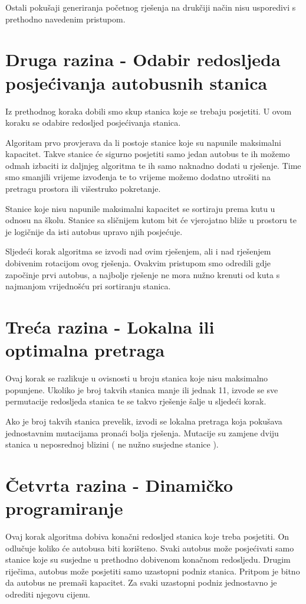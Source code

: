 \documentclass[times, utf8, seminar, numeric]{fer}
\begin{document}
Ostali pokušaji generiranja početnog rješenja na drukčiji način nisu usporedivi s prethodno navedenim pristupom.

\section{Druga razina - Odabir redosljeda posjećivanja autobusnih stanica}
Iz prethodnog koraka dobili smo skup stanica koje se trebaju posjetiti. U ovom koraku se odabire redosljed posjećivanja stanica.

Algoritam prvo provjerava da li postoje stanice koje su napunile maksimalni kapacitet. Takve stanice će sigurno posjetiti samo jedan autobus te ih možemo odmah izbaciti iz daljnjeg algoritma te ih samo naknadno dodati u rješenje. Time smo smanjili vrijeme izvođenja te to vrijeme možemo dodatno utrošiti na pretragu prostora ili višestruko pokretanje.

Stanice koje nisu napunile maksimalni kapacitet se sortiraju prema kutu u odnosu na školu. Stanice sa sličnijem kutom bit će vjerojatno bliže u prostoru te je logičnije da isti autobus upravo njih posjećuje.

Sljedeći korak algoritma se izvodi nad ovim rješenjem, ali i nad rješenjem dobivenim rotacijom ovog rješenja. Ovakvim pristupom smo odredili gdje započinje prvi autobus, a najbolje rješenje ne mora nužno krenuti od kuta s najmanjom vrijednošću pri sortiranju stanica.

\section{Treća razina - Lokalna ili optimalna pretraga}
Ovaj korak se razlikuje u ovisnosti u broju stanica koje nisu maksimalno popunjene. Ukoliko je broj takvih stanica manje ili jednak 11, izvode se sve permutacije redosljeda stanica te se takvo rješenje šalje u sljedeći korak.

Ako je broj takvih stanica prevelik, izvodi se lokalna pretraga koja pokušava jednostavnim mutacijama pronaći bolja rješenja. Mutacije su zamjene dviju stanica u neposrednoj blizini ( ne nužno susjedne stanice ).

\section{Četvrta razina - Dinamičko programiranje}

Ovaj korak algoritma dobiva konačni redosljed stanica koje treba posjetiti. On odlučuje koliko će autobusa biti korišteno. Svaki autobus može posjećivati samo stanice koje su susjedne u prethodno dobivenom konačnom redosljedu. Drugim riječima, autobus može posjetiti samo uzastopni podniz stanica. Pritpom je bitno da autobus ne premaši kapacitet. Za svaki uzastopni podniz jednostavno je odrediti njegovu cijenu.
\end{document}

